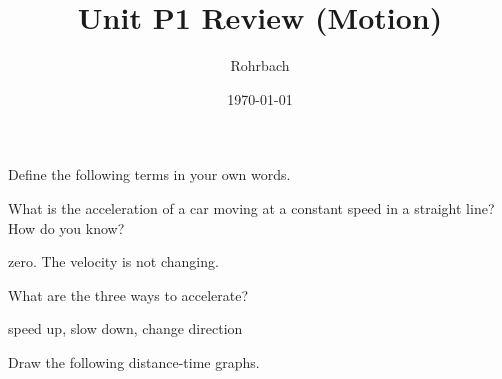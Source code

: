 \documentclass[10pt]{exam}
\title{Unit P1 Review (Motion)}
\author{Rohrbach}
\date{\today}
\begin{document}
\maketitle

\begin{questions}

  \question
    Define the following terms in your own words. 

  \question
    What is the acceleration of a car moving at a constant speed in a straight line?  How do you know?
    \begin{solution}[\stretch{1}]
      zero.  The velocity is not changing.
    \end{solution}

  \question
    What are the three ways to accelerate?
    \begin{solution}[\stretch{1}]
      speed up, slow down, change direction
    \end{solution}

    \question
    Draw the following distance-time graphs.

    \newcommand{\empgraph}[1]{
      \par
      \begin{tikzpicture}
        \begin{axis}[empgraph]
        \ifprintanswers
          \addplot[soln] {#1};
        \fi
        \end{axis}
      \end{tikzpicture}
    }

    \begin{multicols}{2}
      \begin{parts}

\end{parts}
\end{multicols}
\end{questions}
\end{document}
